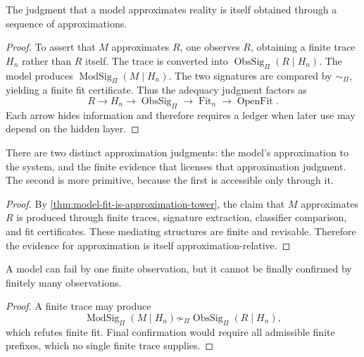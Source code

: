 \begin{theorem}
\label{thm:model-fit-is-approximation-tower}
The judgment that a model approximates reality is itself obtained through a sequence of approximations.
\end{theorem}

\begin{proof}
To assert that $M$ approximates $R$, one observes $R$, obtaining a finite trace $H_n$ rather than $R$ itself. The trace is converted into $\operatorname{ObsSig}_{\Pi}(R\mid H_n)$. The model produces $\operatorname{ModSig}_{\Pi}(M\mid H_n)$. The two signatures are compared by $\sim_{\Pi}$, yielding a finite fit certificate. Thus the adequacy judgment factors as
$$
R
\longrightarrow
H_n
\longrightarrow
\operatorname{ObsSig}_{\Pi}
\longrightarrow
\operatorname{Fit}_n
\longrightarrow
\operatorname{OpenFit}.
$$
Each arrow hides information and therefore requires a ledger when later use may depend on the hidden layer.
\end{proof}

\begin{corollary}
\label{cor:evidence-for-approximation-is-approximate}
There are two distinct approximation judgments: the model's approximation to the system, and the finite evidence that licenses that approximation judgment. The second is more primitive, because the first is accessible only through it.
\end{corollary}

\begin{proof}
By \autoref{thm:model-fit-is-approximation-tower}, the claim that $M$ approximates $R$ is produced through finite traces, signature extraction, classifier comparison, and fit certificates. These mediating structures are finite and revisable. Therefore the evidence for approximation is itself approximation-relative.
\end{proof}

\begin{corollary}
\label{cor:falsification-finite-confirmation-open}
A model can fail by one finite observation, but it cannot be finally confirmed by finitely many observations.
\end{corollary}

\begin{proof}
A finite trace may produce
$$
\operatorname{ModSig}_{\Pi}(M\mid H_n)
\not\sim_{\Pi}
\operatorname{ObsSig}_{\Pi}(R\mid H_n),
$$
which refutes finite fit. Final confirmation would require all admissible finite prefixes, which no single finite trace supplies.
\end{proof}

